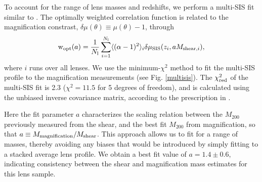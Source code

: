 To account for the range of lens masses and redshifts, we perform a multi-\ac{SIS} fit similar to \citet{Hildebrandt11}.  The optimally weighted correlation function is related to the magnification constrast, $\delta\mu(\theta) \equiv \mu(\theta) -1$, through
\begin{equation}
\mathrm{w}_{\rm opt}(a)= \frac{1}{N_{\rm l}}\sum_{i=1}^{N_{\rm l}} \langle (\alpha -1)^2 \rangle_i \delta \mu_{\rm SIS} (z_i, aM_{{\rm shear},i}),
\end{equation}
where $i$ runs over all lenses. We use the minimum-$\chi^2$ method to fit the multi-\ac{SIS} profile to the magnification measurements (see Fig. \ref{multisis}). The $\chi^2_{\rm red}$ of the multi-\ac{SIS} fit is 2.3 ($\chi^2=11.5$ for 5 degrees of freedom), and is calculated using the unbiased inverse covariance matrix, according to the prescription in \citet{Hartlap07}.

Here the fit parameter $a$ characterizes the scaling relation between the $M_{200}$ previously measured from the shear, and the best fit $M_{200}$ from magnification, so that $a \equiv M_{\rm magnification}/M_{\rm shear}$. This approach allows us to fit for a range of masses, thereby avoiding any biases that would be introduced by simply fitting to a stacked average lens profile.  We obtain a best fit value of $a=1.4 \pm 0.6$, indicating consistency between the shear and magnification mass estimates for this lens sample.


